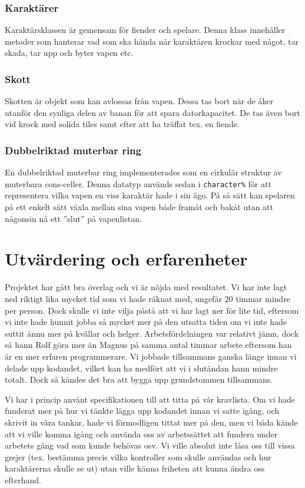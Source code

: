 \documentclass{scrartcl}
\newcommand{\code}[1]%
{\texttt{#1}}
\begin{document}
\subsubsection{Karaktärer}

Karaktärsklassen är gemensam för fiender och spelare. Denna klass innehåller metoder som hanterar vad som ska hända när karaktären krockar med något, tar skada, tar upp och byter vapen etc.  

\subsubsection{Skott}

Skotten är objekt som kan avlossas från vapen. Dessa tas bort när de åker utanför den synliga delen av banan för att spara datorkapacitet. De tas även bort vid krock med solida tiles samt efter att ha träffat tex. en fiende. 

\subsubsection{Dubbelriktad muterbar ring}

En dubbelriktad muterbar ring implementerades som en cirkulär struktur av muterbara cons-celler. Denna datatyp används sedan i \code{character\%} för att representera vilka vapen en viss karaktär hade i sin ägo. På så sätt kan spelaren på ett enkelt sätt växla mellan sina vapen både framåt och bakåt utan att någonsin nå ett ''slut'' på vapenlistan.

\section{Utvärdering och erfarenheter}

Projektet har gått bra överlag och vi är nöjda med resultatet. Vi har inte lagt ned riktigt lika mycket tid som vi hade räknat med, ungefär 20 timmar mindre per person. Dock skulle vi inte vilja påstå att vi har lagt ner för lite tid, eftersom vi inte hade hunnit jobba så mycket mer på den utsatta tiden om vi inte hade suttit ännu mer på kvällar och helger. Arbetsfördelningen var relativt jämn, dock så hann Rolf göra mer än Magnus på samma antal timmar arbete eftersom han är en mer erfaren programmerare. Vi jobbade tillsammans ganska länge innan vi delade upp kodandet, vilket kan ha medfört att vi i slutändan hann mindre totalt. Dock så kändes det bra att bygga upp grundstommen tillsammans. 

Vi har i princip använt specifikationen till att titta på vår kravlista. Om vi hade funderat mer på hur vi tänkte lägga upp kodandet innan vi satte igång, och skrivit in våra tankar, hade vi förmodligen tittat mer på den, men vi båda kände att vi ville komma igång och använda oss av arbetssättet att fundera under arbetets gång vad som kunde behövas osv. Vi ville absolut inte låsa oss till vissa grejer (tex. bestämma precis vilka kontroller som skulle användas och hur karaktärerna skulle se ut) utan ville känna friheten att kunna ändra oss efterhand. 
\end{document}
